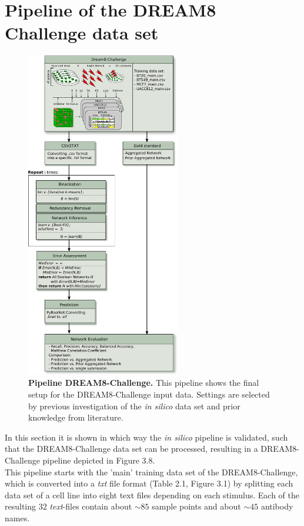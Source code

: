 \section{Pipeline of the DREAM8 Challenge data set}
\begin{figure}[!h]
\centering\includegraphics[width=0.6\textwidth]{./Bilder/pipeline_dream8.pdf}
\caption[Pipeline DREAM8-Challenge]{\textbf{Pipeline DREAM8-Challenge. }This pipeline shows the final setup for the DREAM8-Challenge input data. Settings are selected by previous investigation of the \textit{in silico} data set and prior knowledge from literature.}
\label{fig:9}
\end{figure}



In this section it is shown in which way the \textit{in silico} pipeline is validated, such that the DREAM8-Challenge data set can be processed, resulting in a DREAM8-Challenge pipeline depicted in Figure 3.8.\\ 
This pipeline starts with the 'main' training data set of the DREAM8-Challenge, which is converted into a \textit{txt} file format (Table 2.1, Figure 3.1) by splitting each data set of a cell line into eight text files depending on each stimulus. Each of the resulting 32 \textit{text}-files contain about $\sim 85$ sample points and about $\sim 45$ antibody names.


